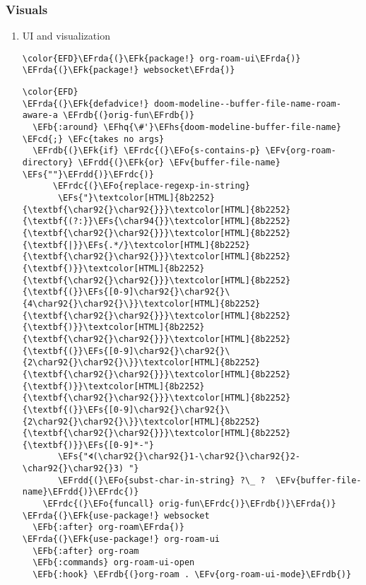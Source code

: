 \documentclass[c]{article}
\theoremstyle{plain}%
\theoremstyle{definition}
\theoremstyle{remark}
\newcommand{\EFc}[1]{\textcolor{EFc}{#1}} %
\newcommand{\EFcd}[1]{\textcolor{EFcd}{#1}} %
\newcommand{\EFs}[1]{\textcolor{EFs}{#1}} %
\newcommand{\EFk}[1]{\textcolor{EFk}{#1}} %
\newcommand{\EFb}[1]{\textcolor{EFb}{#1}} %
\newcommand{\EFv}[1]{\textcolor{EFv}{#1}} %
\newcommand{\EFo}[1]{\textcolor{EFo}{#1}} %
\newcommand{\EFhq}[1]{\textcolor{EFhq}{#1}} %
\newcommand{\EFhs}[1]{\textcolor{EFhs}{#1}} %
\newcommand{\EFrda}[1]{\textcolor{EFrda}{#1}} %
\newcommand{\EFrdb}[1]{\textcolor{EFrdb}{#1}} %
\newcommand{\EFrdc}[1]{\textcolor{EFrdc}{#1}} %
\newcommand{\EFrdd}[1]{\textcolor{EFrdd}{#1}} %
\begin{document}
\subsubsection{Visuals}
\label{sec:org3bc5893}
\begin{enumerate}
\item UI and visualization
\label{sec:orgbc3301d}
\begin{Code}
\begin{Verbatim}
\color{EFD}\EFrda{(}\EFk{package!} org-roam-ui\EFrda{)}
\EFrda{(}\EFk{package!} websocket\EFrda{)}
\end{Verbatim}
\end{Code}
\begin{Code}
\begin{Verbatim}
\color{EFD}
\EFrda{(}\EFk{defadvice!} doom-modeline--buffer-file-name-roam-aware-a \EFrdb{(}orig-fun\EFrdb{)}
  \EFb{:around} \EFhq{\#'}\EFhs{doom-modeline-buffer-file-name} \EFcd{;} \EFc{takes no args}
  \EFrdb{(}\EFk{if} \EFrdc{(}\EFo{s-contains-p} \EFv{org-roam-directory} \EFrdd{(}\EFk{or} \EFv{buffer-file-name} \EFs{""}\EFrdd{)}\EFrdc{)}
      \EFrdc{(}\EFo{replace-regexp-in-string}
       \EFs{"}\textcolor[HTML]{8b2252}{\textbf{\char92{}\char92{}}}\textcolor[HTML]{8b2252}{\textbf{(?:}}\EFs{\char94{}}\textcolor[HTML]{8b2252}{\textbf{\char92{}\char92{}}}\textcolor[HTML]{8b2252}{\textbf{|}}\EFs{.*/}\textcolor[HTML]{8b2252}{\textbf{\char92{}\char92{}}}\textcolor[HTML]{8b2252}{\textbf{)}}\textcolor[HTML]{8b2252}{\textbf{\char92{}\char92{}}}\textcolor[HTML]{8b2252}{\textbf{(}}\EFs{[0-9]\char92{}\char92{}\{4\char92{}\char92{}\}}\textcolor[HTML]{8b2252}{\textbf{\char92{}\char92{}}}\textcolor[HTML]{8b2252}{\textbf{)}}\textcolor[HTML]{8b2252}{\textbf{\char92{}\char92{}}}\textcolor[HTML]{8b2252}{\textbf{(}}\EFs{[0-9]\char92{}\char92{}\{2\char92{}\char92{}\}}\textcolor[HTML]{8b2252}{\textbf{\char92{}\char92{}}}\textcolor[HTML]{8b2252}{\textbf{)}}\textcolor[HTML]{8b2252}{\textbf{\char92{}\char92{}}}\textcolor[HTML]{8b2252}{\textbf{(}}\EFs{[0-9]\char92{}\char92{}\{2\char92{}\char92{}\}}\textcolor[HTML]{8b2252}{\textbf{\char92{}\char92{}}}\textcolor[HTML]{8b2252}{\textbf{)}}\EFs{[0-9]*-"}
       \EFs{"🢔(\char92{}\char92{}1-\char92{}\char92{}2-\char92{}\char92{}3) "}
       \EFrdd{(}\EFo{subst-char-in-string} ?\_ ?  \EFv{buffer-file-name}\EFrdd{)}\EFrdc{)}
    \EFrdc{(}\EFo{funcall} orig-fun\EFrdc{)}\EFrdb{)}\EFrda{)}
\EFrda{(}\EFk{use-package!} websocket
  \EFb{:after} org-roam\EFrda{)}
\EFrda{(}\EFk{use-package!} org-roam-ui
  \EFb{:after} org-roam
  \EFb{:commands} org-roam-ui-open
  \EFb{:hook} \EFrdb{(}org-roam . \EFv{org-roam-ui-mode}\EFrdb{)}

\end{Verbatim}
\end{Code}
\end{enumerate}
\end{document}
